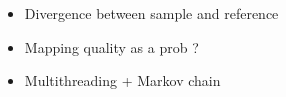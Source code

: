 \documentclass[a4paper,12pt]{article}
\begin{document}
\begin{itemize}
\item Divergence between sample and reference 
\item Mapping quality as a prob ?
\item Multithreading + Markov chain
\end{itemize}


%
%
%
%
%
\end{document}
